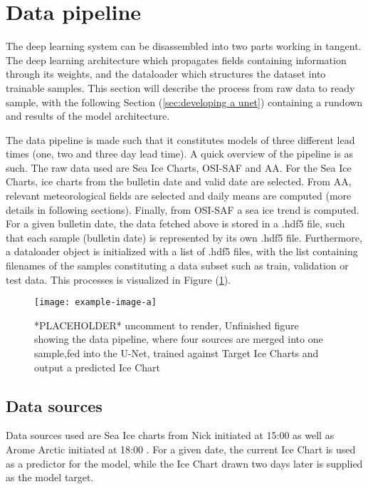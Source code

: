\documentclass[../main/thesis.tex]{subfiles}
\begin{document}
\section{Data pipeline}
The deep learning system can be disassembled into two parts working in tangent. The deep learning architecture which propagates fields containing information through its weights, and the dataloader which structures the dataset into trainable samples. This section will describe the process from raw data to ready sample, with the following Section (\ref{sec:developing a unet}) containing a rundown and results of the model architecture.

The data pipeline is made such that it constitutes models of three different lead times (one, two and three day lead time). A quick overview of the pipeline is as such. The raw data used are Sea Ice Charts, OSI-SAF and AA. For the Sea Ice Charts, ice charts from the bulletin date and valid date are selected. From AA, relevant meteorological fields are selected and daily means are computed (more details in following sections). Finally, from OSI-SAF a sea ice trend is computed. For a given bulletin date, the data fetched above is stored in a .hdf5 file, such that each sample (bulletin date) is represented by its own .hdf5 file. Furthermore, a dataloader object is initialized with a list of .hdf5 files, with the list containing filenames of the samples constituting a data subset such as train, validation or test data. This processes is visualized in Figure (\ref{fig:pipeline_sketch}).

\begin{figure}
    \centering
    \texttt{[image: example-image-a]}
    \iffalse
    \scalebox{0.825}{
    
    }
    \fi
    \caption{\label{fig:pipeline_sketch}*PLACEHOLDER* uncomment to render, Unfinished figure showing the data pipeline, where four sources are merged into one sample,fed into the U-Net, trained against Target Ice Charts and output a predicted Ice Chart}
\end{figure}


\subsection{Data sources}
Data sources used are Sea Ice charts from Nick initiated at 15:00 as well as Arome Arctic initiated at 18:00 \cite{Dinessen2020,Mueller2017}. For a given date, the current Ice Chart is used as a predictor for the model, while the Ice Chart drawn two days later is supplied as the model target.
\end{document}
